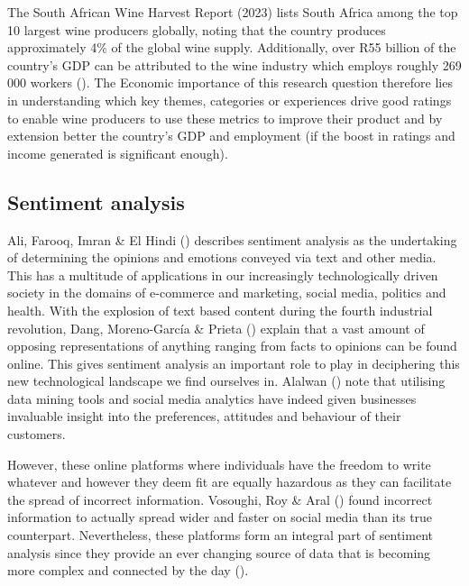 \documentclass[11pt,preprint]{elsarticle}
\numberwithin{equation}{section}
\numberwithin{figure}{section}
\numberwithin{table}{section}
\begin{document}
The South African Wine Harvest Report (2023) lists South Africa among
the top 10 largest wine producers globally, noting that the country
produces approximately 4\% of the global wine supply. Additionally, over
R55 billion of the country's GDP can be attributed to the wine industry
which employs roughly 269 000 workers (). The Economic importance of this research
question therefore lies in understanding which key themes, categories or
experiences drive good ratings to enable wine producers to use these
metrics to improve their product and by extension better the country's
GDP and employment (if the boost in ratings and income generated is
significant enough).

\subsection{Sentiment analysis}\label{sentiment-analysis}

Ali, Farooq, Imran \& El Hindi ()
describes sentiment analysis as the undertaking of determining the
opinions and emotions conveyed via text and other media. This has a
multitude of applications in our increasingly technologically driven
society in the domains of e-commerce and marketing, social media,
politics and health. With the explosion of text based content during the
fourth industrial revolution, Dang, Moreno-García \& Prieta
() explain that a vast amount of
opposing representations of anything ranging from facts to opinions can
be found online. This gives sentiment analysis an important role to play
in deciphering this new technological landscape we find ourselves in.
Alalwan () note that utilising data
mining tools and social media analytics have indeed given businesses
invaluable insight into the preferences, attitudes and behaviour of
their customers.

However, these online platforms where individuals have the freedom to
write whatever and however they deem fit are equally hazardous as they
can facilitate the spread of incorrect information. Vosoughi, Roy \&
Aral () found incorrect information
to actually spread wider and faster on social media than its true
counterpart. Nevertheless, these platforms form an integral part of
sentiment analysis since they provide an ever changing source of data
that is becoming more complex and connected by the day
().
\end{document}
